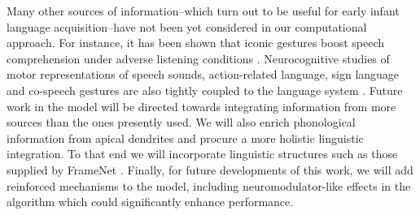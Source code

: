 {Many other sources of information--which turn out to be useful for early infant language acquisition--have not been yet considered in our computational approach. For instance, it has been shown that iconic gestures boost speech comprehension under adverse listening conditions \cite{HOLLE2010875}. Neurocognitive studies of motor representations of speech sounds, action-related language, sign language and co-speech gestures are also tightly coupled to the language system \cite{Willems2007NeuralEF}. Future work in the model will be directed towards integrating information from more sources than the ones presently used. We will also enrich phonological information from apical dendrites and procure a more holistic linguistic integration. To that end we will incorporate linguistic structures such as those supplied by FrameNet \cite{noauthor_about_nodate}. Finally, for future developments of this work, we will add reinforced mechanisms to the model, including neuromodulator-like effects in the algorithm which could significantly enhance performance.
}
























